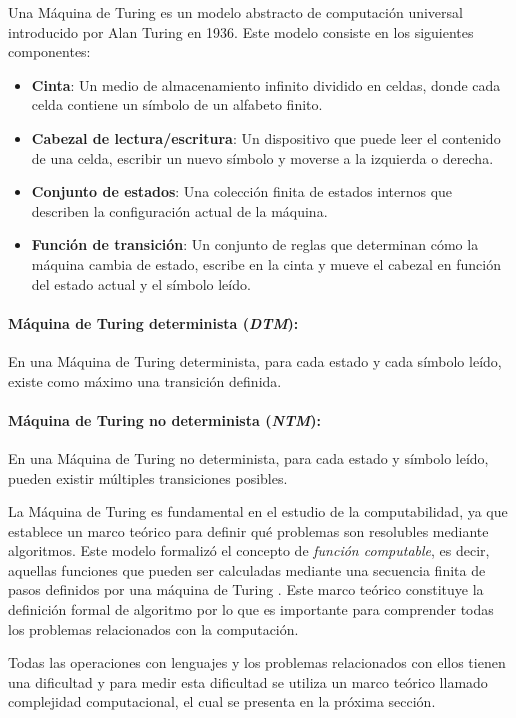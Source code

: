 \documentclass[12pt]{article}
\begin{document}
Una Máquina de Turing \cite{authomataTheory} es un modelo abstracto de computación universal introducido por Alan Turing en 1936. Este modelo consiste en los siguientes componentes:

\begin{itemize}
      \item \textbf{Cinta}: Un medio de almacenamiento infinito dividido en celdas, donde cada celda contiene un símbolo de un alfabeto finito.
      \item \textbf{Cabezal de lectura/escritura}: Un dispositivo que puede leer el contenido de una celda, escribir un nuevo símbolo y moverse a la izquierda o derecha.
      \item \textbf{Conjunto de estados}: Una colección finita de estados internos que describen la configuración actual de la máquina.
      \item \textbf{Función de transición}: Un conjunto de reglas que determinan cómo la máquina cambia de estado, escribe en la cinta y mueve el cabezal en función del estado actual y el símbolo leído.
\end{itemize}

\paragraph{Máquina de Turing determinista (\textit{DTM}):}
En una Máquina de Turing determinista, para cada estado y cada símbolo leído, existe como máximo una transición
definida.
\paragraph{Máquina de Turing no determinista (\textit{NTM}):}
En una Máquina de Turing no determinista, para cada estado y símbolo leído, pueden existir múltiples
transiciones posibles.

La Máquina de Turing es fundamental en el estudio de la computabilidad, ya que establece un marco teórico para definir qué problemas son resolubles mediante algoritmos. Este modelo formalizó el concepto de \textit{función computable}, es decir, aquellas funciones que pueden ser calculadas mediante una secuencia finita de pasos definidos por una máquina de Turing \cite{authomataTheory}. Este marco teórico constituye
la definición formal de algoritmo \cite{authomataTheory} por lo que es importante para comprender todas los problemas relacionados con la computación.

Todas las operaciones con lenguajes y los problemas relacionados con ellos tienen una dificultad y para medir esta dificultad
se utiliza un marco teórico llamado complejidad computacional, el cual se presenta en la próxima sección.
\end{document}
